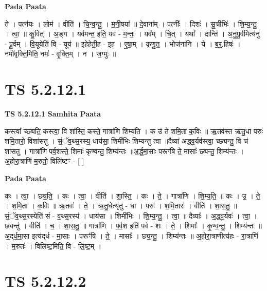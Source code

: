 \documentclass[17pt]{extarticle}
\begin{document}
\textbf{Pada Paata} \newline

ते । पत्न॑यः । लोम॑ । वीति॑ । चि॒न्व॒न्तु॒ । म॒नी॒षया᳚ ॥ दे॒वाना᳚म् । पत्नीः᳚ । दिशः॑ । सू॒चीभिः॑ । शि॒म्य॒न्तु॒ । त्वा॒ ॥ कु॒वित् । अ॒ङ्ग । यव॑मन्त॒ इति॒ यव॑ - म॒न्तः॒ । यव᳚म् । चि॒त् । यथा᳚ । दान्ति॑ । अ॒नु॒पू॒र्वमित्य॑नु - पू॒र्वम् । वि॒यूयेति॑ वि - यूय॑ ॥ इ॒हेहेती॒ह - इ॒ह॒ । ए॒षा॒म् । कृ॒णु॒त॒ । भोज॑नानि । ये । ब॒र्॒.हिषः॑ । नमो॑वृक्ति॒मिति॒ नमः॑ - वृ॒क्ति॒म् । न । ज॒ग्मुः ॥  \newline





\section{ TS 5.2.12.1 }

\textbf{TS 5.2.12.1 } \newline
\textbf{Samhita Paata} \newline

कस्त्वा᳚ च्छ्यति॒ कस्त्वा॒ वि शा᳚स्ति॒ कस्ते॒ गात्रा॑णि शिम्यति । क उ॑ ते शमि॒ता क॒विः ॥ ऋ॒तव॑स्त ऋतु॒धा परुः॑ शमि॒तारो॒ विशा॑सतु । सं॒ॅव॒थ्स॒रस्य॒ धाय॑सा॒ शिमी॑भिः शिम्यन्तु त्वा ॥दैव्या॑ अद्ध्व॒र्यव॑स्त्वा॒ च्छ्यन्तु॒ वि च॑ शासतु । गात्रा॑णि पर्व॒शस्ते॒ शिमाः᳚ कृण्वन्तु॒ शिम्य॑न्तः ॥अ॒र्द्ध॒मा॒साः परूꣳ॑षि ते॒ मासाः᳚ छ्यन्तु॒ शिम्य॑न्तः । अ॒हो॒रा॒त्राणि॑ म॒रुतो॒ विलि॑ष्टꣳ - [  ] \newline

\textbf{Pada Paata} \newline

कः । त्वा॒ । छ्य॒ति॒ । कः । त्वा॒ । वीति॑ । शा॒स्ति॒ । कः । ते॒ । गात्रा॑णि । शि॒म्य॒ति॒ ॥ कः । उ॒ । ते॒ । श॒मि॒ता । क॒विः ॥ ऋ॒तवः॑ । ते॒ । ऋ॒तु॒धेत्यृ॑तु - धा । परुः॑ । श॒मि॒तारः॑ । वीति॑ । शा॒स॒तु॒ ॥ सं॒ॅव॒थ्स॒रस्येति॑ सं - व॒थ्स॒रस्य॑ । धाय॑सा । शिमी॑भिः । शि॒म्य॒न्तु॒ । त्वा॒ ॥ दैव्याः᳚ । अ॒द्ध्व॒र्यवः॑ । त्वा॒ । छ्यन्तु॑ । वीति॑ । च॒ । शा॒स॒तु॒ ॥ गात्रा॑णि । प॒र्व॒श इति॑ पर्व - शः । ते॒ । शिमाः᳚ । कृ॒ण्व॒न्तु॒ । शिम्य॑न्तः ॥ अ॒द्‌र्ध॒मा॒सा इत्य॑द्‌र्ध - मा॒साः । परूꣳ॑षि । ते॒ । मासाः᳚ । छ्य॒न्तु॒ । शिम्य॑न्तः ॥ अ॒हो॒रा॒त्राणीत्य॑हः - रा॒त्राणि॑ । म॒रुतः॑ । विलि॑ष्ट॒मिति॒ वि - लि॒ष्ट॒म् ।  \newline





\section{ TS 5.2.12.2 }
\end{document}
